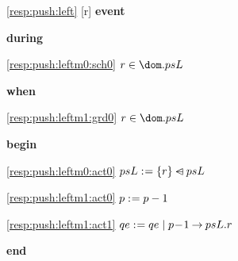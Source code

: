 \noindent \ref{resp:push:left} [r] \textbf{event}
\begin{block}
  \item   \textbf{during}
  \begin{block}
  \item[ \eqref{resp:push:leftm0:sch0} ]{$r \in \dom.psL $} %
  \end{block}
  \item   \textbf{when}
  \begin{block}
  \item[ \eqref{resp:push:leftm1:grd0} ]{$r \in \dom.psL $} %
  \end{block}
  \item   \textbf{begin}
  \begin{block}
  \item[ \eqref{resp:push:leftm0:act0} ]{$psL \mathrel{:\mkern1mu=} \{r\} \mathbin{\lhd\mkern-14mu-} psL $} %
  \item[ \eqref{resp:push:leftm1:act0} ]{$p \mathrel{:\mkern1mu=} p-1$} %
  \item[ \eqref{resp:push:leftm1:act1} ]{$qe \mathrel{:\mkern1mu=} qe \; | \; p\! - \!1 \mathbin\rightarrow psL.r$} %
  \end{block}
  \item   \textbf{end} \\
\end{block}
